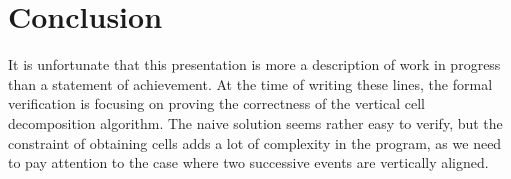 \documentclass{easychair}
\begin{document}
\section{Conclusion}
It is unfortunate that this presentation is more a description of work
in progress than a statement of achievement.  At the time of writing
these lines, the formal verification
is focusing on proving the correctness of the vertical cell
decomposition algorithm.  The naive solution seems rather easy to
verify, but the constraint of obtaining cells adds a lot of complexity
in the program, as we need to pay attention to the case where two
successive events are vertically aligned.



\end{document}
